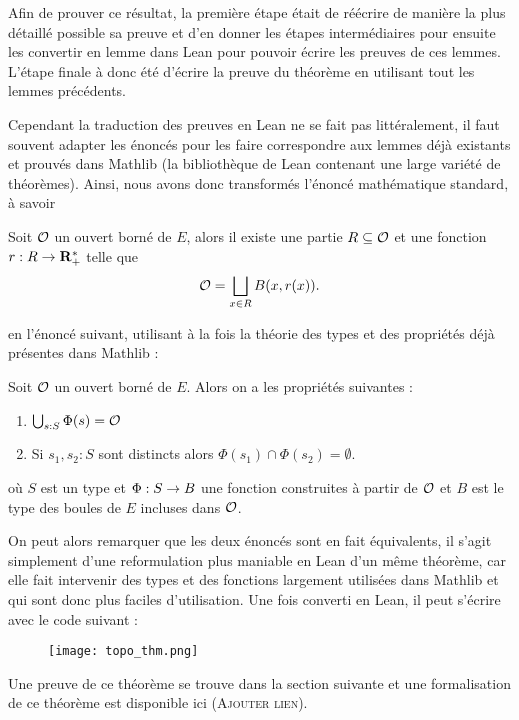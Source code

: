\documentclass[../../rapport.tex]{subfiles}
\begin{document}
  Afin de prouver ce résultat, la première étape était de réécrire de manière la plus détaillé possible sa preuve et d'en donner
  les étapes intermédiaires pour ensuite les convertir en lemme dans Lean pour pouvoir écrire les preuves de ces lemmes.
  L'étape finale à donc été d'écrire la preuve du théorème en utilisant tout les lemmes précédents.

  Cependant la traduction des preuves en Lean ne se fait pas littéralement, il faut souvent adapter les énoncés pour
  les faire correspondre aux lemmes déjà existants et prouvés dans Mathlib (la bibliothèque de Lean contenant une large variété de théorèmes).
  Ainsi, nous avons donc transformés l'énoncé mathématique standard, à savoir
  \begin{theorem*}
    Soit $\mathcal{O}$ un ouvert borné de $E$, alors il existe une partie $R \subseteq \mathcal{O}$ et une fonction $r : R \rightarrow \mathbf R^*_+$ telle que
    $$\mathcal{O} = \bigsqcup_{x \in R}{B(x, r(x))}.$$
  \end{theorem*}
  en l'énoncé suivant, utilisant à la fois la théorie des types et des propriétés déjà présentes dans Mathlib :

  \begin{theorem*}
    Soit $\mathcal{O}$ un ouvert borné de $E$. Alors on a les propriétés suivantes :
    \begin{enumerate}
      \item $\bigcup_{s : S}{\Phi(s)} = \mathcal{O}$
      \item Si $s_1, s_2 : S$ sont distincts alors $\Phi(s_1) \cap \Phi(s_2) = \emptyset$.
    \end{enumerate}
    où $S$ est un type et $\Phi : S \rightarrow B$ une fonction construites à partir de $\mathcal{O}$ et $B$ est le type des boules de $E$ incluses dans $\mathcal{O}$.
  \end{theorem*}

  On peut alors remarquer que les deux énoncés sont en fait équivalents, il s'agit simplement d'une reformulation
  plus maniable en Lean d'un même théorème, car elle fait intervenir des types et des fonctions largement utilisées dans Mathlib
  et qui sont donc plus faciles d'utilisation. Une fois converti en Lean, il peut s'écrire avec le code suivant :

  \begin{figure}[ht]
    \centering
    \texttt{[image: topo\_thm.png]}
  \end{figure}

  Une preuve de ce théorème se trouve dans la section suivante et une formalisation de ce théorème est disponible ici (\textsc{Ajouter lien}).
\end{document}
